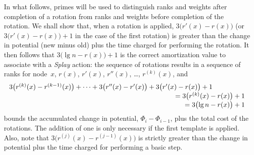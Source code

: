 \documentclass[11pt]{article}
\begin{document}
In what follows, primes will be used to distinguish ranks and weights after
completion of a rotation from ranks and weights before completion of
the rotation.  We shall show that, when a rotation is applied,
$3 \bigl( r'(x) - r(x) \bigr)$ (or $3 \bigl( r'(x) - r(x) \bigr) + 1$
in the case of the first rotation) is greater than the change in potential
(new minus old) plus the time charged for performing the rotation.
It then follows that $3 \bigl( \lg n - r(x) \bigr) + 1$ is
the correct amortization value to associate with a \emph{Splay} action:
the sequence of rotations results in a sequence of ranks for node~$x$,
$r(x)$, $r'(x)$, $r''(x)$, \dots, $r^{(k)}(x)$, and
\begin{displaymath}
    \vbox{%
    \hbox to\textwidth{%
      $3 \bigl( r^{(k)}(x) - r^{(k-1)}(x) \bigr) + \cdots + 3 \bigl( r''(x) - r'(x) \bigr) + 3 \bigl( r'(x) - r(x) \bigr) + 1$\hfil}
    \hbox to\textwidth{%
      \hfil${}=3 \bigl( r^{(k)}(x) - r(x) \bigr) + 1$}
    \hbox to\textwidth{%
      \hfil${}=3 \bigl( \lg n - r(x) \bigr) + 1$}}
\end{displaymath}
bounds the accumulated change in potential, $\Phi_i - \Phi_{i-1}$,
plus the total cost of the rotations.  The addition of one is only
necessary if the first template is applied.  Also, note that
$3 \bigl( r^{(j)}(x) - r^{(j-1)}(x) \bigr)$ is strictly greater than the
change in potential plus the time charged for performing a basic step.
\end{document}
